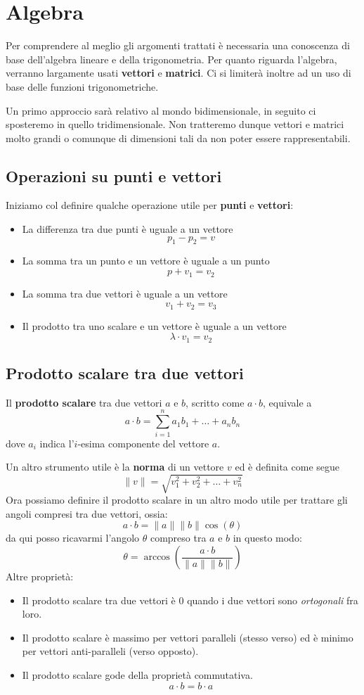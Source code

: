 \chapter{Algebra} \label{algebra}
Per comprendere al meglio gli argomenti trattati \`e necessaria una conoscenza di base
dell'algebra lineare e della trigonometria. Per quanto riguarda l'algebra, verranno largamente usati
\textbf{vettori} e \textbf{matrici}. Ci si limiter\`a inoltre ad un uso di base delle funzioni trigonometriche.

Un primo approccio sar\`a relativo al mondo bidimensionale, in seguito ci sposteremo in quello tridimensionale.
Non tratteremo dunque vettori e matrici molto grandi o comunque di dimensioni tali da non poter essere rappresentabili.

\section{Operazioni su punti e vettori}
Iniziamo col definire qualche operazione utile per \textbf{punti} e \textbf{vettori}:
\begin{itemize}
	\item La differenza tra due punti \`e uguale a un vettore
	      \[ p_1 - p_2 = v \]
	\item La somma tra un punto e un vettore \`e uguale a un punto
	      \[ p + v_1 = v_2 \]
	\item La somma tra due vettori \`e uguale a un vettore
	      \[ v_1 + v_2 = v_3 \]
	\item Il prodotto tra uno scalare e un vettore \`e uguale a un vettore
	      \[ \lambda \cdot v_1 = v_2 \]
\end{itemize}

\section{Prodotto scalare tra due vettori}
Il \textbf{prodotto scalare} tra due vettori $a$ e $b$, scritto come $a \cdot b$, equivale a
\[ a \cdot b = \sum_{i=1}^n a_1 b_1 + \dots + a_n b_n  \]
dove $a_i$ indica l'$i$-esima componente del vettore $a$.

Un altro strumento utile \`e la \textbf{norma} di un vettore $v$ ed \`e definita come segue
\[ \| v \| = \sqrt{v_1^2 + v_2^2 + \dots + v_n^2} \]
Ora possiamo definire il prodotto scalare in un altro modo utile per trattare gli angoli compresi tra due vettori, ossia:
\[ a \cdot b = \| a \| \| b \| \cos{(\theta)} \]
da qui posso ricavarmi l'angolo $\theta$ compreso tra $a$ e $b$ in questo modo:
\[ \theta = \arccos{\left( \frac{a \cdot b}{\| a \| \| b \|} \right)} \]
Altre propriet\`a:
\begin{itemize}
	\item Il prodotto scalare tra due vettori \`e 0 quando i due vettori sono \emph{ortogonali}
	      fra loro.
	\item Il prodotto scalare \`e massimo per vettori paralleli (stesso verso) ed \`e minimo
	      per vettori anti-paralleli (verso opposto).
	\item Il prodotto scalare gode della propriet\`a commutativa.
	      \[ a \cdot b = b \cdot a \]
\end{itemize}


